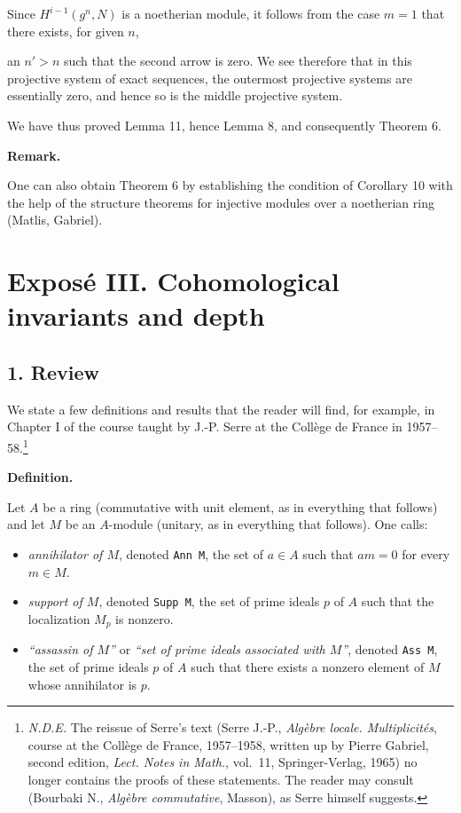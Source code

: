 \documentclass[
]{article}
\providecommand{\tightlist}{%
  \setlength{\itemsep}{0pt}\setlength{\parskip}{0pt}}
\begin{document}
Since \(H^{i-1}(g^{n}, N)\) is a noetherian module, it follows from the
case \(m = 1\) that there exists, for given \(n\),

an \(n' > n\) such that the second arrow is zero. We see therefore that
in this projective system of exact sequences, the outermost projective
systems are essentially zero, and hence so is the middle projective
system.

We have thus proved Lemma 11, hence Lemma 8, and consequently Theorem 6.

\textbf{Remark.}

One can also obtain Theorem 6 by establishing the condition of Corollary
10 with the help of the structure theorems for injective modules over a
noetherian ring (Matlis, Gabriel).

\section{Exposé III. Cohomological invariants and
depth}\label{exposuxe9-iii.-cohomological-invariants-and-depth}

\subsection{1. Review}\label{review}

We state a few definitions and results that the reader will find, for
example, in Chapter I of the course taught by J.-P. Serre at the Collège
de France in 1957--58.\footnote{\emph{N.D.E.} The reissue of Serre's
  text (Serre J.-P., \emph{Algèbre locale. Multiplicités}, course at the
  Collège de France, 1957--1958, written up by Pierre Gabriel, second
  edition, \emph{Lect. Notes in Math.}, vol.~11, Springer-Verlag, 1965)
  no longer contains the proofs of these statements. The reader may
  consult (Bourbaki N., \emph{Algèbre commutative}, Masson), as Serre
  himself suggests.}

\textbf{Definition.}

Let \(A\) be a ring (commutative with unit element, as in everything
that follows) and let \(M\) be an \(A\)-module (unitary, as in
everything that follows). One calls:

\begin{itemize}
\tightlist
\item
  \emph{annihilator of \(M\)}, denoted \texttt{Ann\ M}, the set of
  \(a \in A\) such that \(am = 0\) for every \(m \in M\).
\item
  \emph{support of \(M\)}, denoted \texttt{Supp\ M}, the set of prime
  ideals \(p\) of \(A\) such that the localization \(M_{p}\) is nonzero.
\item
  \emph{``assassin of \(M\)''} or \emph{``set of prime ideals associated
  with \(M\)''}, denoted \texttt{Ass\ M}, the set of prime ideals \(p\)
  of \(A\) such that there exists a nonzero element of \(M\) whose
  annihilator is \(p\).
\end{itemize}
\end{document}
